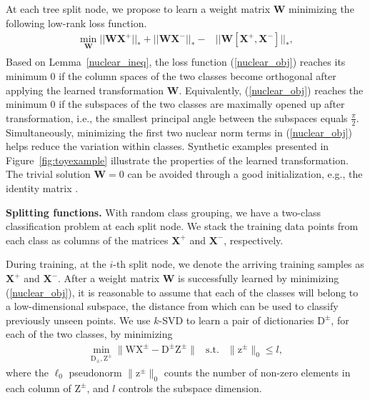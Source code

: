 \documentclass[runningheads]{llncs}
\newcommand{\bb}[1]{\boldsymbol{\mathrm{#1}}}
\begin{document}
At each tree split node, we propose to learn a
weight matrix $\mathbf{W}$  minimizing
the following low-rank loss function.
\begin{align} \label{nuclear_obj} \nonumber
\underset{\mathbf{W}} \min ||\mathbf{W X}^+||_* + ||\mathbf{W X}^-||_* -& ||\mathbf{W [X^+, X^-]}||_*,\\
\end{align}
Based on Lemma~\ref{nuclear_ineq}, the loss function (\ref{nuclear_obj}) reaches
its minimum $0$ if the column spaces of the two classes become orthogonal after
applying the learned transformation $\mathbf{W}$. Equivalently,
(\ref{nuclear_obj}) reaches the minimum $0$ if the subspaces of the two classes
are maximally opened up after transformation, i.e., the smallest principal angle
between the subspaces equals $\frac{\pi}{2}$. Simultaneously, minimizing the
first two nuclear norm terms in (\ref{nuclear_obj}) helps reduce the variation
within classes.  Synthetic examples presented in Figure~\ref{fig:toyexample}
illustrate the properties of the learned transformation.  The trivial solution
$\mathbf{W}=0$ can be avoided through a good initialization, e.g., the identity matrix \cite{lowrankT}.


\textbf{Splitting functions.}  With random class grouping, we have a two-class
classification problem at each split node.  We stack the training data points
from each class as columns of the matrices $\mathbf{X}^+$ and $\mathbf{X}^-$,
respectively.


During training, at the $i$-th split node, we denote the arriving training
samples as $\mathbf{X}^+$ and $\mathbf{X}^-$.  After a weight matrix
$\mathbf{W}$ is successfully learned by minimizing (\ref{nuclear_obj}), it is
reasonable to assume that each of the classes will belong to a low-dimensional
subspace, the distance from which can be used to classify previously unseen
points.  We use $k$-SVD \cite{Elad_KSVD} to learn a pair of dictionaries
$\bb{D}^{\pm}$, for each of the two classes, by minimizing
\begin{eqnarray}
\min_{\bb{D}_\pm, \bb{Z}^\pm} \|  \bb{WX}^\pm - \bb{D}^\pm \bb{Z}^\pm \|  & \mathrm{s.t.} & \| \bb{z}^\pm \|_0 \le l,
\end{eqnarray}
where the $\ell_0$ pseudonorm $\| \bb{z}^\pm \|_0$ counts the number of non-zero elements in each column of $\bb{Z}^\pm$, and $l$ controls the subspace dimension.
\end{document}
